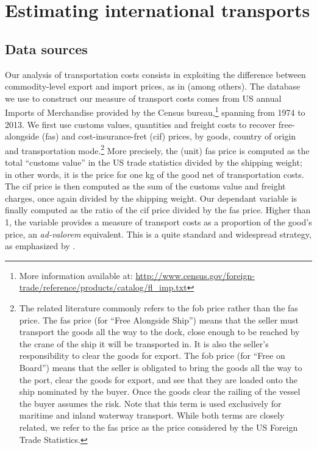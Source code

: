 \documentclass[a4paper,11pt]{article}
\begin{document}
\section{Estimating international transports\label{sec:data_method}}

\subsection{Data sources}

Our analysis of transportation costs consists in exploiting the difference between commodity-level export and import prices, as in \cite{hummels2007} (among others). The database we use to construct our measure of transport costs comes from US annual Imports of Merchandise provided by the Census bureau,\footnote{More information available at: \url{http://www.census.gov/foreign-trade/reference/products/catalog/fl_imp.txt}} spanning from 1974 to 2013. We first use customs values, quantities and freight costs to recover free-alongside (fas) and cost-insurance-fret (cif) prices, by goods, country of origin and transportation mode.\footnote{The related literature commonly refers to the fob price rather than the fas price. The fas price (for ``Free Alongside Ship'') means that the seller must transport the goods all the way to the dock, close enough to be reached by the crane of the ship it will be transported in. It is also the seller's responsibility to clear the goods for export. The fob price (for ``Free on Board'') means that the seller is obligated to bring the goods all the way to the port, clear the goods for export, and see that they are loaded onto the ship nominated by the buyer. Once the goods clear the railing of the vessel the buyer assumes the risk. Note that this term is used exclusively for maritime and inland waterway transport. While both terms are closely related, we refer to the fas price as the price considered by the US Foreign Trade Statistics.} More precisely, the (unit) fas price is computed as the total ``customs value'' in the US trade statistics divided by the shipping weight; in other words, it is the price for one kg of the good net of transportation costs. The cif price is then computed as the sum of the customs value and freight charges, once again divided by the shipping weight. Our dependant variable is finally computed as the ratio of the cif price divided by the fas price. Higher than 1, the variable provides a measure of transport costs as a proportion of the good's price, an \emph{ad-valorem} equivalent. This is a quite standard and widespread strategy, as emphasized by \citet{anderson_wincoop_jel}.
\end{document}
